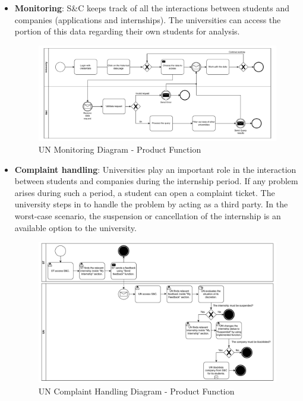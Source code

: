 \begin{itemize}
      \item \textbf{Monitoring}: S\&C keeps track of all the interactions between students and companies (applications
            and internships). The universities can access the portion of this data regarding their own students for
            analysis.

            \begin{figure}[H]
                  \centering
                  \includegraphics[width=1.0\textwidth]{Images/BPMN_14.pdf}
                  \caption{UN Monitoring Diagram - Product Function}
                  \label{fig:un_monitoring_diagram}
            \end{figure}
      \item \textbf{Complaint handling}: Universities play an important role in the interaction between students and
            companies during the internship period. If any problem arises during such a period, a student can open a
            complaint ticket. The university steps in to handle the problem by acting as a third party. In the
            worst-case scenario, the suspension or cancellation of the internship is an available option to the
            university.

            \begin{figure}[H]
                  \centering
                  \includegraphics[width=1.0\textwidth]{Images/BPMN_15.pdf}
                  \caption{UN Complaint Handling Diagram - Product Function}
                  \label{fig:un_complaint_handling_diagram}
            \end{figure}


\end{itemize}
